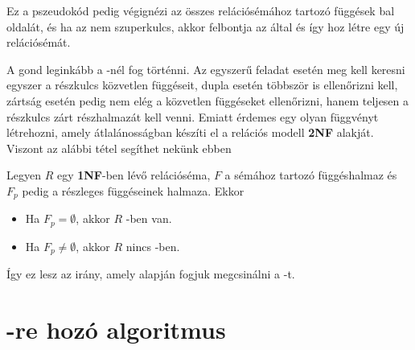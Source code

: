 \hfill \break
Ez a pszeudokód pedig végignézi az összes relációsémához tartozó függések bal oldalát, és ha az nem szuperkulcs, akkor felbontja az által és így hoz létre egy új relációsémát. \par
A gond leginkább a \nfk-nél fog történni. Az egyszerű feladat esetén meg kell keresni egyszer a részkulcs közvetlen függéseit, dupla esetén többször is ellenőrizni kell, zártság esetén pedig nem elég a közvetlen függéseket ellenőrizni, hanem teljesen a részkulcs zárt részhalmazát kell venni. Emiatt érdemes egy olyan függvényt létrehozni, amely átlalánosságban készíti el a relációs modell \textbf{2NF} alakját. Viszont az alábbi tétel segíthet nekünk ebben

\begin{tet}
Legyen $R$ egy \textbf{1NF}-ben lévő relációséma, $F$ a sémához tartozó függéshalmaz és $F_p$ pedig a részleges függéseinek halmaza. Ekkor
\begin{itemize}
    \item Ha $F_p = \emptyset$, akkor $R$ \nfk-ben van.
    \item Ha $F_p \not = \emptyset$, akkor $R$ nincs \nfk-ben.
\end{itemize}
\end{tet}

Így ez lesz az irány, amely alapján fogjuk megcsinálni a \nfk-t.

\section{\nfk-re hozó algoritmus}


